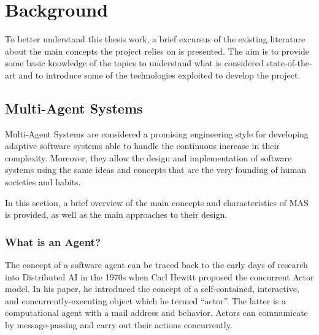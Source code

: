 \chapter{Background}
To better understand this thesis work, a brief excursus of the existing literature about the main concepts the project relies on is presented. The aim is to provide some basic knowledge of the topics to understand what is considered state-of-the-art and to introduce some of the technologies exploited to develop the project.

\section{Multi-Agent Systems}
Multi-Agent Systems are considered a promising engineering style for developing adaptive software systems able to handle the continuous increase in their complexity.
Moreover, they allow the design and implementation of software systems using the same ideas and concepts that are the very founding of human societies and habits.

In this section, a brief overview of the main concepts and characteristics of MAS is provided, as well as the main approaches to their design.

\subsection{What is an Agent?}
The concept of a software agent can be traced back to the early days of research into Distributed AI in the 1970s when Carl Hewitt proposed the concurrent Actor model.
In his paper, he introduced the concept of a self-contained, interactive, and concurrently-executing object which he termed ``actor''.
The latter is a computational agent with a mail address and behavior. Actors can communicate by message-passing and carry out their actions concurrently.~\cite{hewitt1977viewing}

